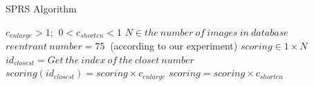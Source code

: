 \documentclass[letterpaper]{article}
\begin{document}
\begin{algorithm}[h]

  \caption{SPRS Algorithm}
  \begin{algorithmic}[2]      
       \State $c_{enlarge} > 1$;  $\ 0 < c_{shorten} < 1$
     \State $N\in the\ number\ of\ images\ in\ database$      
     \State $reentrant\ number = 75\ $ \State (according to our experiment)
    \State $scoring \in 1 \times N$
               \State $id_{closest}= Get\ the\ index\ of\ the\ closet\ number$
               \State $scoring(id_{closest})=scoring \times c_{enlarge}$                              
         \EndFor
         \State $scoring = scoring \times c_{shorten}$
        
    \EndFor

  \end{algorithmic}
\end{algorithm}
\end{document}

